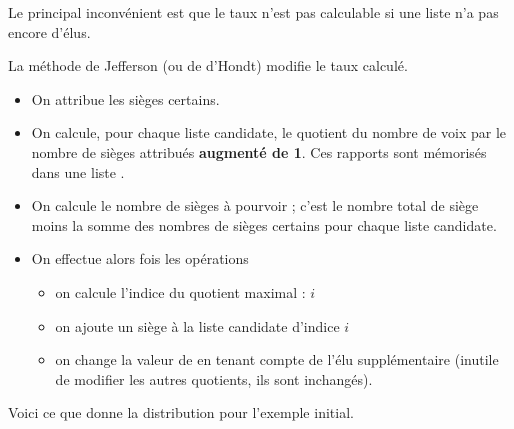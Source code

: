 Le principal inconvénient est que le taux n'est pas calculable si une liste n'a pas encore d'élus.

\medskip

La méthode de Jefferson (ou de d'Hondt) modifie le taux calculé.
\begin{itemize}
\item On attribue les sièges certains.
\item On calcule, pour chaque liste candidate, le quotient du nombre de voix par le nombre de sièges attribués {\bf augmenté de 1}. Ces rapports sont mémorisés dans une liste .
\item On calcule le nombre de sièges à pourvoir  ; c'est le nombre total de siège moins la somme des nombres de sièges certains pour chaque liste candidate.
\item On effectue alors  fois les opérations 
\begin{itemize}
\item on calcule l'indice du quotient maximal : $i$
\item on ajoute un siège à la liste candidate d'indice $i$
\item on change la valeur de  en tenant compte de l'élu supplémentaire (inutile de modifier les autres quotients, ils sont inchangés).
\end{itemize}
\end{itemize}
Voici ce que donne la distribution pour l'exemple initial.

